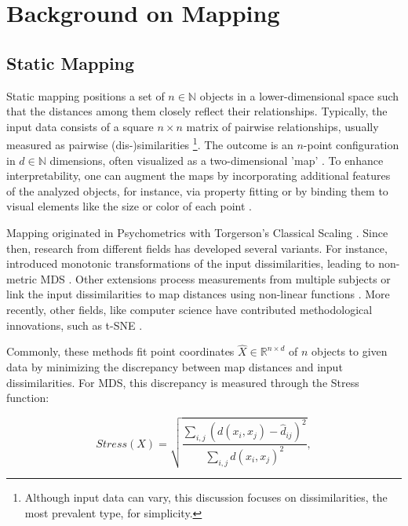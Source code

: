 \documentclass[article]{jss}
\begin{document}
\section{Background on Mapping} \label{sec:background}

\subsection{Static Mapping} \label{sec:static-mapping}

Static mapping positions a set of $n \in \mathbb{N}$ objects in a lower-dimensional space such that the distances among
 them closely reflect their relationships. Typically, the input data consists of a square $n \times n$ matrix of 
 pairwise relationships, usually measured as pairwise (dis-)similarities
\footnote{Although input data can vary, this discussion focuses on dissimilarities, the most prevalent type, for simplicity.}. 
The outcome is an $n$-point configuration in $d \in \mathbb{N}$ dimensions, often visualized as a two-dimensional 
'map' \citep{Borg+Groenen:2005}. To enhance interpretability, one can augment the maps by incorporating additional 
features of the analyzed objects, for instance, via property fitting \citep{DeSarbo+Hoffman:1987} or by binding them to 
visual elements like the size or color of each point \citep{Ringel+Skiera:2016}.

Mapping originated in Psychometrics with Torgerson's Classical Scaling \citep{Torgerson:1958}. Since then, research from 
different fields has developed several variants. For instance, \cite{Shepard:1962a, Shepard:1962b} introduced monotonic 
transformations of the input dissimilarities, leading to non-metric MDS \citep{Kruskal:1964a, Kruskal:1964b}. Other 
extensions process measurements from multiple subjects \citep{Carroll+Chang:1970} or link the input dissimilarities to 
map distances using non-linear functions \citep{Sammon:1969}. More recently, other fields, like computer science have 
contributed methodological innovations, such as t-SNE \citep{van-der-Maaten+Hinton:2008}.

Commonly, these methods fit point coordinates $\hat{X} \in \mathbb{R}^{n \times d}$ of $n$ objects to 
given data by minimizing the discrepancy between map distances and input dissimilarities. For MDS, this 
discrepancy is measured through the Stress function:

\begin{equation} \label{eq:stress}
  Stress(X) = \sqrt{\frac{\sum_{i,j}(d(x_i, x_j) - \hat{d}_{ij})^2}{\sum_{i,j}d(x_i, x_j)^2}},
\end{equation}
\end{document}
